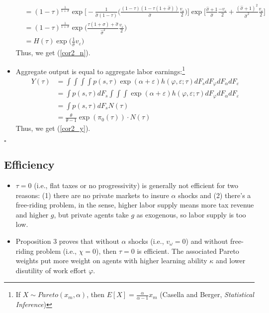 \documentclass{article}
\begin{document}
\begin{itemize}
\begin{align*}
&= (1 - \tau)^{\frac{1}{1+\sigma}}\exp \Bigg[- \frac{1}{\hat \sigma(1-\tau)} \Bigg( \frac{(1-\tau)(1-\tau(1+\hat\sigma))}{\hat \sigma}\frac{v_\varepsilon}{2} \Bigg)\Bigg]   \exp\Bigg[ \frac{\hat \sigma + 1}{\hat\sigma} \frac{-v_\varepsilon}{2} + \frac{(\hat \sigma + 1)^2}{\hat\sigma^2}\frac{v_\varepsilon}{2} \Bigg]\\
&= (1-\tau)^{\frac{1}{1+\sigma}} \exp\Bigg(\frac{\tau(1 + \hat \sigma) + \hat \sigma}{\hat \sigma^2}\frac{v_\varepsilon}{2}\Bigg)\\
&= H(\tau) \exp\Bigg(\frac{1}{\hat\sigma} v_\varepsilon\Bigg)
\end{align*}
Thus, we get (\ref{cor2_n}). 
\item Aggregate output is equal to aggregate labor earnings:\footnote{If $X \sim Pareto(x_m, \alpha)$, then $E[X] =\frac{\alpha}{\alpha-1} x_m$ (Casella and Berger, \textit{Statistical Inference})}
\begin{align*}
Y(\tau) 
&= \int \int \int \int p(s, \tau)\exp(\alpha + \varepsilon)h(\varphi, \varepsilon; \tau) dF_s dF_\varphi dF_\alpha dF_\varepsilon\\
&= \int p(s, \tau) dF_s\int \int \int \exp(\alpha + \varepsilon)h(\varphi, \varepsilon; \tau)  dF_\varphi dF_\alpha dF_\varepsilon\\
&= \int p(s, \tau) dF_s N(\tau)\\
&= \frac{\theta}{\theta-1} \exp(\pi_0(\tau)) \cdot N(\tau)
\end{align*}
Thus, we get (\ref{cor2_y}). 
\end{itemize}
$\square$

\subsection{Efficiency}

\begin{itemize}
\item $\tau = 0$ (i.e., flat taxes or no progressivity) is generally not efficient for two reasons: (1) there are no private markets to insure $\alpha$ shocks and (2) there's a free-riding problem, in the sense, higher labor supply means more tax revenue and higher $g$, but private agents take $g$ as exogenous, so labor supply is too low.
\item Proposition 3 proves that without $\alpha$ shocks (i.e., $v_\omega = 0$) and without free-riding problem (i.e., $\chi = 0$), then $\tau = 0$ is efficient. The associated Pareto weights put more weight on agents with higher learning ability $\kappa$ and lower disutility of work effort $\varphi$.
\end{itemize}
\end{document}
